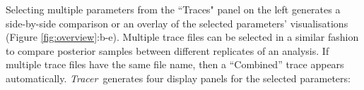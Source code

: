 \documentclass{bioinfo_tracer}
\newcommand{\tracer}{\emph{Tracer}}
\begin{document}

Selecting multiple parameters from the ``Traces" panel on the left generates a side-by-side comparison or an overlay of the selected parameters' visualisations (Figure \ref{fig:overview}:b-e).
Multiple trace files can be selected in a similar fashion to compare posterior samples between different replicates of an analysis.
If multiple trace files have the same file name,  then a ``Combined'' trace appears automatically.
\tracer\ generates four display panels for the selected parameters:
\end{document}
